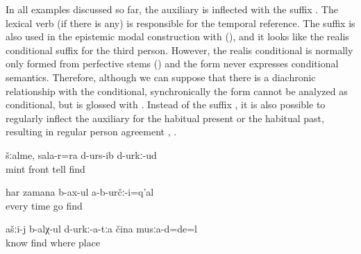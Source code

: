 In all examples discussed so far, the auxiliary is inflected with the suffix  . The lexical verb (if there is any) is responsible for the temporal reference. The suffix  is also used in the epistemic modal construction with  (), and it looks like the realis conditional suffix for the third person. However, the realis conditional is normally only formed from perfective stems () and the form  never expresses conditional semantics. Therefore, although we can suppose that there is a diachronic relationship with the conditional, synchronically the form cannot be analyzed as conditional, but is glossed with . Instead of the suffix , it is also possible to regularly inflect the auxiliary for the habitual present  or the habitual past, resulting in regular person agreement  , .
%
\begin{exe}
	\ex	\label{ex:‎(It is made from) mint; I probably also told it (= how to make it) the last time}
	\gll	šːalme,	sala-r=ra	d-urs-ib	d-urkː-ud\\
		mint	front	tell	find\\
	\glt	{}
	
	\ex	\label{ex:‎‎Probably they did not always go (to drink milk)}
	\gll	har	zamana	b-ax-ul	a-b-určː-i=q'al\\
		every	time	go	find\\
	\glt	{}

	\ex	\label{ex:You should know / you probably know, where (in which place) they (the berries) were}
	\gll	ašːi-j	b-alχ-ul	d-urkː-a-tːa	čina	musːa-d=de=l\\
			know	find	where	place\\
	\glt	{}
\end{exe}

